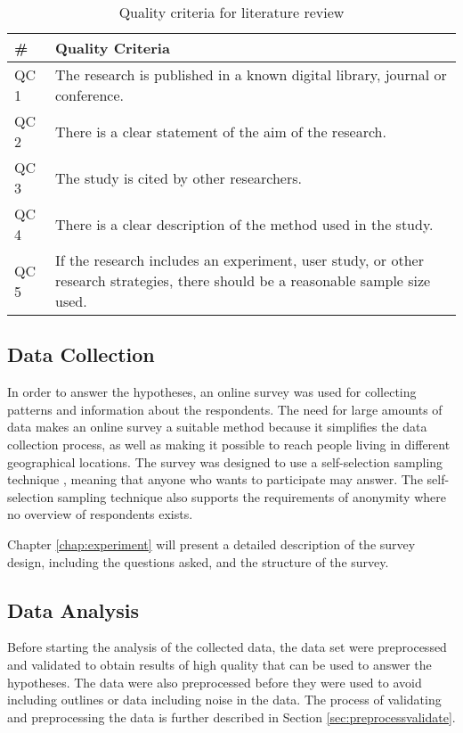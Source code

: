         \begin{table}[H]
          \centering
          \begin{tabular}{| l | p{10cm} |}
            \hline
            {\bf \#} & {\bf Quality Criteria} \\ \hline
            QC 1 & The research is published in a known digital library, journal or conference. \\ \hline
            QC 2 & There is a clear statement of the aim of the research. \\ \hline
            QC 3 & The study is cited by other researchers. \\ \hline
            QC 4 & There is a clear description of the method used in the study. \\ \hline
            QC 5 & If the research includes an experiment, user study, or other research strategies, there should be a reasonable sample size used. \\ \hline
          \end{tabular}
          \caption{Quality criteria for literature review}
          \label{tab:QualityCriteria}
        \end{table}

    \subsection{Data Collection}

      In order to answer the hypotheses, an online survey was used for collecting patterns and information about the respondents. The need for large amounts of data makes an online survey a suitable method because it simplifies the data collection process, as well as making it possible to reach people living in different geographical locations. The survey was designed to use a self-selection sampling technique \cite{empiriske}, meaning that anyone who wants to participate may answer. The self-selection sampling technique also supports the requirements of anonymity where no overview of respondents exists. 

      Chapter \ref{chap:experiment} will present a detailed description of the survey design, including the questions asked, and the structure of the survey.

    \subsection{Data Analysis}
    
      Before starting the analysis of the collected data, the data set were preprocessed and validated to obtain results of high quality that can be used to answer the hypotheses. The data were also preprocessed before they were used to avoid including outlines or data including noise in the data. The process of validating and preprocessing the data is further described in Section \ref{sec:preprocessvalidate}.

